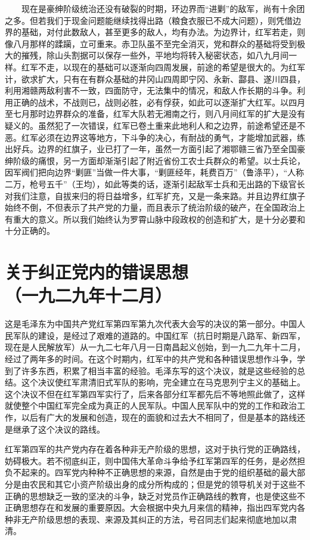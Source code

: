 \documentclass[cn,11pt,chinese]{elegantbook}
\def\myformat#1{\hfil\hfil #1}
\begin{document}
　　现在是豪绅阶级统治还没有破裂的时期，环边界而“进剿”的敌军，尚有十余团之多。但若我们于现金问题能继续找得出路（粮食衣服已不成大问题），则凭借边界的基础，对付此数敌人，甚至更多的敌人，均有办法。为边界计，红军若走，则像八月那样的蹂躏，立可重来。赤卫队虽不至完全消灭，党和群众的基础将受到极大的摧残，除山头割据可以保存一些外，平地均将转入秘密状态，如八九月间一样。红军不走，以现在的基础可以逐渐向四周发展，前途的希望是很大的。为红军计，欲求扩大，只有在有群众基础的井冈山四周即宁冈、永新、酃县、遂川四县，利用湘赣两敌利害不一致，四面防守，无法集中的情况，和敌人作长期的斗争。利用正确的战术，不战则已，战则必胜，必有俘获，如此可以逐渐扩大红军。以四月至七月那时边界群众的准备，红军大队若无湘南之行，则八月间红军的扩大是没有疑义的。虽然犯了一次错误，红军已卷土重来此地利人和之边界，前途希望还是不恶。红军必须在边界这等地方，下斗争的决心，有耐战的勇气，才能增加武器，练出好兵。边界的红旗子，业已打了一年，虽然一方面引起了湘鄂赣三省乃至全国豪绅阶级的痛恨，另一方面却渐渐引起了附近省份工农士兵群众的希望。以士兵论，因军阀们把向边界“剿匪”当做一件大事，“剿匪经年，耗费百万”（鲁涤平），“人称二万，枪号五千”（王均），如此等类的话，逐渐引起敌军士兵和无出路的下级官长对我们注意，自拔来归的将日益增多，红军扩充，又是一条来路。并且边界红旗子始终不倒，不但表示了共产党的力量，而且表示了统治阶级的破产，在全国政治上有重大的意义。所以我们始终认为罗霄山脉中段政权的创造和扩大，是十分必要和十分正确的。\\
\newpage\section*{\myformat{关于纠正党内的错误思想}\\\myformat{（一九二九年十二月）}}
\begin{introduction}\item 这是毛泽东为中国共产党红军第四军第九次代表大会写的决议的第一部分。中国人民军队的建设，是经过了艰难的道路的。中国红军（抗日时期是八路军、新四军，现在是人民解放军）从一九二七年八月一日南昌起义创始，到一九二九年十二月，经过了两年多的时间。在这个时期内，红军中的共产党和各种错误思想作斗争，学到了许多东西，积累了相当丰富的经验。毛泽东写的这个决议，就是这些经验的总结。这个决议使红军肃清旧式军队的影响，完全建立在马克思列宁主义的基础上。这个决议不但在红军第四军实行了，后来各部分红军都先后不等地照此做了，这样就使整个中国红军完全成为真正的人民军队。中国人民军队中的党的工作和政治工作，以后有广大的发展和创造，现在的面貌和过去大不相同了，但是基本的路线还是继承了这个决议的路线。\end{introduction}
红军第四军的共产党内存在着各种非无产阶级的思想，这对于执行党的正确路线，妨碍极大。若不彻底纠正，则中国伟大革命斗争给予红军第四军的任务，是必然担负不起来的。四军党内种种不正确思想的来源，自然是由于党的组织基础的最大部分是由农民和其它小资产阶级出身的成分所构成的；但是党的领导机关对于这些不正确的思想缺乏一致的坚决的斗争，缺乏对党员作正确路线的教育，也是使这些不正确思想存在和发展的重要原因。大会根据中央九月来信的精神，指出四军党内各种非无产阶级思想的表现、来源及其纠正的方法，号召同志们起来彻底地加以肃清。 \\
\end{document}
